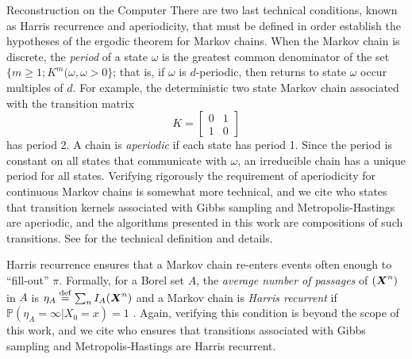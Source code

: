 \begin{chapter}{Reconstruction on the Computer}
There are two last technical conditions, known as Harris recurrence and aperiodicity, that must be defined in order establish the hypotheses of the ergodic theorem for Markov chains.
When the Markov chain is discrete, the \emph{period} of a state $\omega$ is the greatest common denominator of the set $\{m\ge 1; K^m(\omega,\omega > 0\}$; that is, if $\omega$ is $d$-periodic, then returns to state $\omega$ occur multiples of $d$.
For example, the deterministic two state Markov chain associated with the transition matrix
\begin{equation}
  K = \begin{bmatrix}
    0 & 1\\
    1 & 0
  \end{bmatrix}
\end{equation}
has period 2.
A chain is \emph{aperiodic} if each state has period 1. 
Since the period is constant on all states that communicate with $\omega$, an irreducible chain has a unique period for all states.  
Verifying rigorously the requirement of aperiodicity for continuous Markov chains is somewhat more technical, and we cite \citep{liu2008monte} who states that transition kernels associated with Gibbs sampling and Metropolis-Hastings are aperiodic, and the algorithms presented in this work are compositions of such transitions.
See \citep{robert2013monte} for the technical definition and details.

Harris recurrence ensures that a Markov chain re-enters events often enough to ``fill-out'' $\pi$. 
Formally, for a Borel set $A$, the \emph{average number of passages} of $(\mbox{\boldmath$X$}^n)$ in $A$ is $\eta_A\stackrel{\rm def}{=} \sum_n I_A(\mbox{\boldmath$X$}^n)$ and a Markov chain is \emph{Harris recurrent} if $\mathbb P(\eta_A = \infty|X_0=x) =1$ \citep{robert2013monte}. 
Again, verifying this condition is beyond the scope of this work, and we cite \citep{robert2013monte} who ensures that transitions associated with Gibbs sampling and Metropolis-Hastings are Harris recurrent.


\end{chapter}
